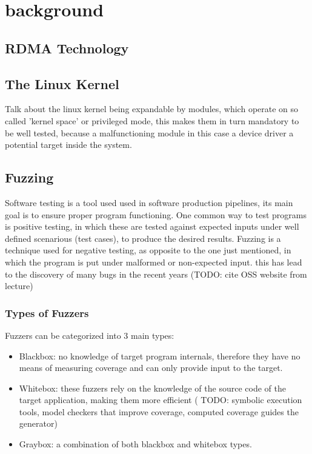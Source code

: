 \section{background}



\subsection{RDMA Technology}


\subsection{The Linux Kernel}

Talk about the linux kernel being expandable by modules, which operate on
so called 'kernel space' or privileged mode, this makes them in turn mandatory
to be well tested, because  a malfunctioning module in this case a device 
driver a potential target inside the system.

\subsection{Fuzzing}

Software testing is a tool used used in software production pipelines, its main goal is to ensure proper program functioning. One common way to test programs is 
positive testing, in which these are tested against expected inputs under well defined scenarious (test cases), to produce the desired results.
Fuzzing is a technique used for negative testing, as opposite to the one just mentioned, in which the program is put under malformed or non-expected input. this
has lead to the discovery of many bugs in the recent years (TODO: cite OSS website from lecture)


\subsubsection{Types of Fuzzers}
 
Fuzzers can be categorized into 3 main types\cite{fetzer20}:

\begin{itemize}
    \item Blackbox: no knowledge of target program internals, therefore they have no means of measuring coverage and can only provide input to the target.
    \item Whitebox: these fuzzers rely on the knowledge of the source code of the target application, making them more efficient ( TODO: symbolic execution tools, model checkers that improve coverage, computed coverage guides the generator)
    \item Graybox: a combination of both blackbox and whitebox types.
\end{itemize}




